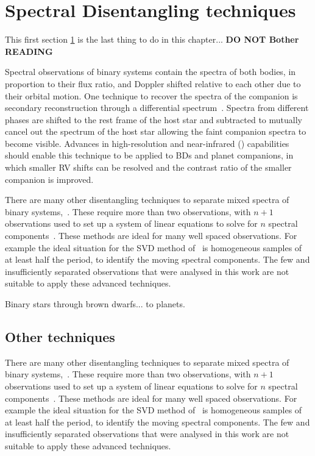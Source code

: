 
\section{Spectral Disentangling techniques}
\label{sec:disentangling_techniques}
This first section \cref{sec:disentangling_techniques} is the last thing to do in this chapter... \textbf{DO NOT Bother READING} 

Spectral observations of binary systems contain the spectra of both bodies, in proportion to their flux ratio, and Doppler shifted relative to each other due to their orbital motion.
One technique to recover the spectra of the companion is secondary reconstruction through a differential spectrum~\citep{ferluga_separating_1997}.
Spectra from different phases are shifted to the rest frame of the host star and subtracted to mutually cancel out the spectrum of the host star allowing the faint companion spectra to become visible.
Advances in high-resolution and near-infrared (\nir{}) capabilities should enable this technique to be applied to {BD}s and planet companions, in which smaller {RV} shifts can be resolved and the contrast ratio of the smaller companion is improved.


There are many other disentangling techniques to separate mixed spectra of binary systems,~\citep[e.g.][]{hadrava_disentangling_2009}.
These require more than two observations, with  \(n+1\) observations used to set up a system of linear equations to solve for \(n\) spectral components~\citep[e.g.][]{simon_disentangling_1994,czekala_disentangling_2017, sablowski_spectral_2016}.
These methods are ideal for many well spaced observations.
For example the ideal situation for the {SVD} method of~\citet{sablowski_spectral_2016} is homogeneous samples of at least half the period, to identify the moving spectral components.
The few and insufficiently separated observations that were analysed in this work are not suitable to apply these advanced techniques.


Binary stars through brown dwarfs...
to planets.


\subsection*{Other techniques}
There are many other disentangling techniques to separate mixed spectra of binary systems,~\citep[e.g.][]{hadrava_disentangling_2009}.
These require more than two observations, with  \(n+1\) observations used to set up a system of linear equations to solve for \(n\) spectral components~\citep[e.g.][]{simon_disentangling_1994,czekala_disentangling_2017, sablowski_spectral_2016}.
These methods are ideal for many well spaced observations.
For example the ideal situation for the {SVD} method of~\citet{sablowski_spectral_2016} is homogeneous samples of at least half the period, to identify the moving spectral components.
The few and insufficiently separated observations that were analysed in this work are not suitable to apply these advanced techniques.


